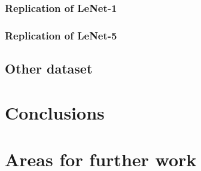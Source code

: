 \documentclass[12pt, twocolumn]{article}
\begin{document}
\subsubsection{Replication of LeNet-1}
\subsubsection{Replication of LeNet-5}
 
\subsection{Other dataset}
\section{Conclusions}

\section{Areas for further work}



 
\end{document}
